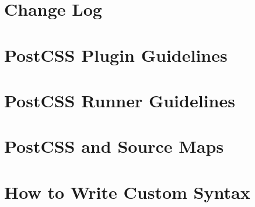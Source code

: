 \documentclass[twoside]{book}
\newcommand{\+}{\discretionary{\mbox{\scriptsize$\hookleftarrow$}}{}{}}
\begin{document}
\chapter{Change Log}
\label{md__c_1_workspace_demo_src_main_script_node_modules_icss-utils_node_modules_postcss__c_h_a_n_g_e_l_o_g}

\chapter{Post\+C\+SS Plugin Guidelines}
\label{md__c_1_workspace_demo_src_main_script_node_modules_icss-utils_node_modules_postcss_docs_guidelines_plugin}

\chapter{Post\+C\+SS Runner Guidelines}
\label{md__c_1_workspace_demo_src_main_script_node_modules_icss-utils_node_modules_postcss_docs_guidelines_runner}

\chapter{Post\+C\+SS and Source Maps}
\label{md__c_1_workspace_demo_src_main_script_node_modules_icss-utils_node_modules_postcss_docs_source-maps}

\chapter{How to Write Custom Syntax}
\label{md__c_1_workspace_demo_src_main_script_node_modules_icss-utils_node_modules_postcss_docs_syntax}

\end{document}
